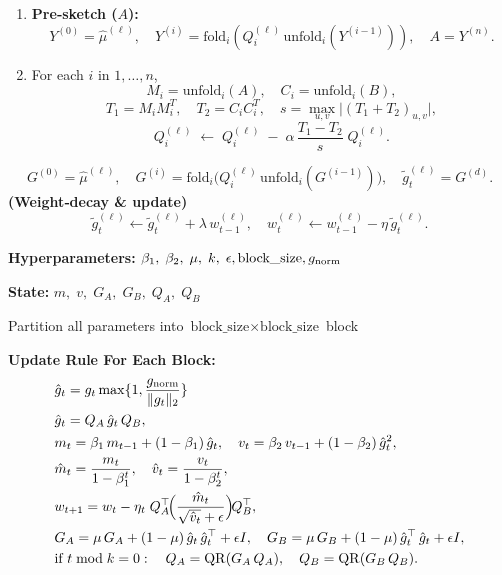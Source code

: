 \begin{algorithm}[H]
\begin{tcolorbox}
\begin{enumerate}[left=1em]
\[            B=X^{(n)}.
          \]
        \item \textbf{Pre‐sketch ($A$):}
          \[
            Y^{(0)}=\hat\mu^{(\ell)},\quad
            Y^{(i)}=\text{fold}_i\left(Q_i^{(\ell)}\,\text{unfold}_i(Y^{(i-1)})\right) ,\quad
            A=Y^{(n)}.
          \]
        \item For each $i$ in $1,\dots,n$,
          \[
            M_i = \mathrm{unfold}_i(A),\quad
            C_i = \mathrm{unfold}_i(B),
          \]
          \[
            T_1 = M_i M_i^{T},\quad
            T_2 = C_i C_i^{T},\quad
            s = \max_{u,v}\lvert (T_1+T_2)_{u,v}\rvert,
          \]
          \[
            Q_i^{(\ell)} \;\leftarrow\;
            Q_i^{(\ell)} \;-\;\alpha
            \,\frac{T_1 - T_2}{s}\;Q_i^{(\ell)}.
          \]
      \end{enumerate}
      \[
        G^{(0)} = \hat\mu^{(\ell)},\quad
        G^{(i)} = \mathrm{fold}_i\bigl(Q_i^{(\ell)}\,\mathrm{unfold}_i(G^{(i-1)})\bigr),\quad
        \tilde g_t^{(\ell)} = G^{(d)}.
      \]
    \textbf{(Weight‐decay \& update)}  
      \[
        \tilde g_t^{(\ell)} \leftarrow \tilde g_t^{(\ell)} + \lambda\,w_{t-1}^{(\ell)},\quad
        w_t^{(\ell)} \leftarrow w_{t-1}^{(\ell)} - \eta\,\tilde g_t^{(\ell)}.
      \]
  \end{tcolorbox}
\end{algorithm}


\begin{algorithm}[H]
  \caption{SOAP}
  \label{alg:soap}
  \begin{tcolorbox}
  \textbf{Hyperparameters:} $\beta_1,\;\beta_2,\;\mu,\;k,\;\epsilon,\text{block\_size}, g_{\mathrm{norm}}$
  
  \textbf{State:} $m,\;v,\;G_A,\;G_B,\;Q_A,\;Q_B$
  
  Partition all parameters into $\text{block\_size} \times \text{block\_size}$ block
  
  \textbf{Update Rule For Each Block:}
  \begin{align*}
  &\hat g_t = g_t \max\{1, \frac{g_{\mathrm{norm}}}{\|g_t\|_2}\} \\
  &\hat g_t = Q_A\,\hat g_t\,Q_B,\\
  &m_t = \beta_1\,m_{t-1} + (1-\beta_1)\,\hat g_t,\quad
   v_t = \beta_2\,v_{t-1} + (1-\beta_2)\,\hat g_t^2,\\
  &\hat m_t = \frac{m_t}{1-\beta_1^{t}},\quad
   \hat v_t = \frac{v_t}{1-\beta_2^{t}},\\
  &w_{t+1} = w_t - \eta_t\;Q_A^\top\!
     \Bigl(\frac{\hat m_t}{\sqrt{\hat v_t} + \epsilon}\Bigr)\!Q_B^\top,\\
  &G_A = \mu\,G_A + (1-\mu)\,\hat g_t\,\hat g_t^\top + \epsilon I,\quad
  G_B = \mu\,G_B + (1-\mu)\,\hat g_t^\top\,\hat g_t + \epsilon I,\\
  &\text{if }t \bmod k = 0: \quad Q_A = \mathrm{QR}(G_A\,Q_A),\quad
     Q_B = \mathrm{QR}(G_B\,Q_B).
  \end{align*}
  \end{tcolorbox}
\end{algorithm}



